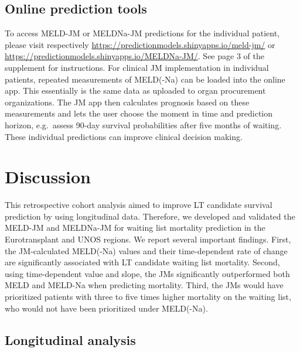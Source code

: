 \documentclass[11pt,english,]{book} %
\begin{document}
\hypertarget{online-prediction-tools}{%
\subsection*{Online prediction tools}\label{online-prediction-tools}}

To access MELD-JM or MELDNa-JM predictions for the individual patient, please visit respectively \url{https://predictionmodels.shinyapps.io/meld-jm/} or \url{https://predictionmodels.shinyapps.io/MELDNa-JM/}. See page 3 of the supplement for instructions. For clinical JM implementation in individual patients, repeated measurements of MELD(-Na) can be loaded into the online app. This essentially is the same data as uploaded to organ procurement organizations. The JM app then calculates prognosis based on these measurements and lets the user choose the moment in time and prediction horizon, e.g.~assess 90-day survival probabilities after five months of waiting. These individual predictions can improve clinical decision making.

\hypertarget{discussion-2}{%
\section*{Discussion}\label{discussion-2}}

This retrospective cohort analysis aimed to improve LT candidate survival prediction by using longitudinal data. Therefore, we developed and validated the MELD-JM and MELDNa-JM for waiting list mortality prediction in the Eurotransplant and UNOS regions. We report several important findings. First, the JM-calculated MELD(-Na) values and their time-dependent rate of change are significantly associated with LT candidate waiting list mortality. Second, using time-dependent value and slope, the JMs significantly outperformed both MELD and MELD-Na when predicting mortality. Third, the JMs would have prioritized patients with three to five times higher mortality on the waiting list, who would not have been prioritized under MELD(-Na).

\hypertarget{longitudinal-analysis-1}{%
\subsection*{Longitudinal analysis}\label{longitudinal-analysis-1}}
\end{document}
